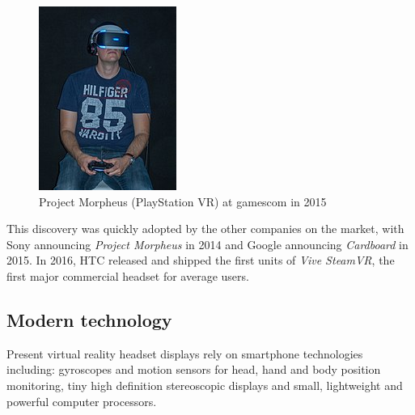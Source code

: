 \documentclass[12pt,a4paper,twoside]{report}
\begin{document}
\begin{figure}
  \includegraphics[width=1.1\linewidth]{img/Sony_morpheus.jpg}
  \caption{Project Morpheus (PlayStation VR) at gamescom in 2015}
  \label{fig:morpheus}
\end{figure}

This discovery was quickly adopted by the other companies on the market, with Sony announcing \textit{Project Morpheus} in 2014 and Google announcing \textit{Cardboard} in 2015. In 2016, HTC released and shipped the first units of \textit{Vive SteamVR}, the first major commercial headset for average users.

\subsection{Modern technology}

Present virtual reality headset displays rely on smartphone technologies including: gyroscopes and motion sensors for head, hand and body position monitoring, tiny high definition stereoscopic displays and small, lightweight and powerful computer processors.
\end{document}

